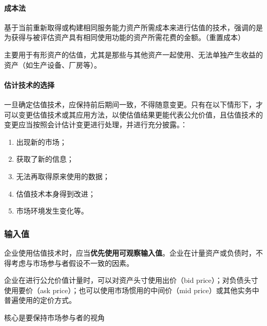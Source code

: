 \documentclass[UTF8,12pt]{ctexart}
\numberwithin{equation}{section} %
\numberwithin{figure}{section}
\numberwithin{table}{section}
\begin{document}
	
	
	\paragraph{成本法}
	基于当前重新取得或构建相同服务能力资产所需成本来进行估值的技术，强调的是为获得与被评估资产具有相同使用功能的资产所需花费的金额。（重置成本）
	 
	主要用于有形资产的估值，尤其是那些与其他资产一起使用、无法单独产生收益的资产（如生产设备、厂房等）。
	
	\paragraph{估计技术的选择}	
	一旦确定估值技术，应保持前后期间一致，不得随意变更。只有在以下情形下，才可以变更估值技术或其应用方法，以使估值结果更能代表公允价值，且估值技术的变更应当按照会计估计变更进行处理，并进行充分披露。：
	\begin{enumerate}
		\item 出现新的市场；
		
		\item 获取了新的信息；
		
		\item 无法再取得原来使用的数据；
		
		\item 估值技术本身得到改进；
		
		\item 市场环境发生变化等。
	\end{enumerate}
	

	
	\subsubsection{输入值}
	企业使用估值技术时，应当\textbf{优先使用可观察输入值}。企业在计量资产或负债时，不得考虑与市场参与者假设不一致的因素。
	
	企业在进行公允价值计量时，可以对资产头寸使用出价（bid price）；对负债头寸使用要价（ask price）；也可以使用市场惯用的中间价（mid price）或其他实务中普遍使用的定价方式。	
	
	核心是要保持市场参与者的视角
	
\end{document}
